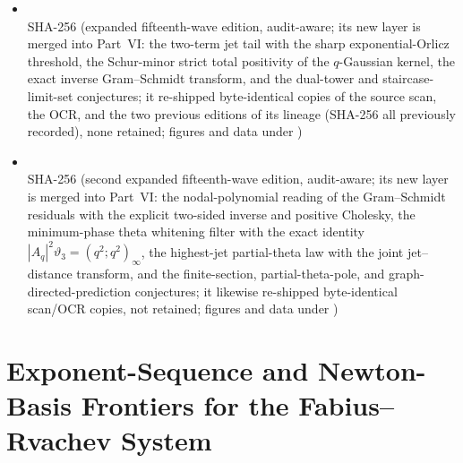 \documentclass[11pt,oneside]{article}
\numberwithin{equation}{section}
\theoremstyle{definition}
\theoremstyle{remark}
\begin{document}
\begin{itemize}
\item {} \\ {\footnotesize SHA-256 } (expanded fifteenth-wave edition, audit-aware; its new layer is merged into Part~VI: the two-term jet tail with the sharp exponential-Orlicz threshold, the Schur-minor strict total positivity of the $q$-Gaussian kernel, the exact inverse Gram--Schmidt transform, and the dual-tower and staircase-limit-set conjectures; it re-shipped byte-identical copies of the source scan, the OCR, and the two previous editions of its lineage (SHA-256 all previously recorded), none retained; figures and data under )
\item {} \\ {\footnotesize SHA-256 } (second expanded fifteenth-wave edition, audit-aware; its new layer is merged into Part~VI: the nodal-polynomial reading of the Gram--Schmidt residuals with the explicit two-sided inverse and positive Cholesky, the minimum-phase theta whitening filter with the exact identity $|A_q|^2\vartheta_3=(q^2;q^2)_\infty$, the highest-jet partial-theta law with the joint jet--distance transform, and the finite-section, partial-theta-pole, and graph-directed-prediction conjectures; it likewise re-shipped byte-identical scan/OCR copies, not retained; figures and data under )
\end{itemize}
\clearpage
\part{Exponent-Sequence and Newton-Basis Frontiers for the Fabius--Rvachev System}
\end{document}
